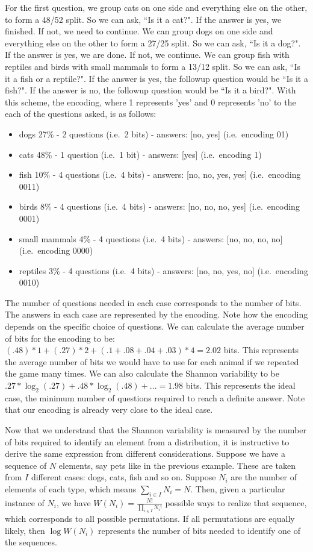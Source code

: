 \documentclass[iopart]{revtex4-1}
\begin{document}
\noindent
For the first question, we group cats on one side and everything else on the other, to form a 48/52 split. So we can ask, ``Is it a cat?". If the answer is yes, we finished. If not, we need to continue. We can group dogs on one side and everything else on the other to form a 27/25 split. So we can ask, ``Is it a dog?". If the answer is yes, we are done. If not, we continue. We can group fish with reptiles and birds with small mammals to form a 13/12 split. So we can ask, ``Is it a fish or a reptile?". If the answer is yes, the followup question would be ``Is it a fish?". If the answer is no, the followup question would be ``Is it a bird?". With this scheme, the encoding, where 1 represents 'yes' and 0 represents 'no' to the each of the questions asked, is as follows:
\begin{itemize}
\item dogs 27\% - 2 questions (i.e.~2 bits) - answers: [no, yes] (i.e.~encoding 01)
\item cats 48\% - 1 question (i.e.~1 bit) - answers: [yes] (i.e.~encoding 1)
\item fish 10\% - 4 questions (i.e.~4 bits) - answers: [no, no, yes, yes] (i.e.~encoding 0011)
\item birds 8\% - 4 questions (i.e.~4 bits) - answers: [no, no, no, yes] (i.e.~encoding 0001)
\item small mammals 4\% - 4 questions (i.e.~4 bits) - answers: [no, no, no, no] (i.e.~encoding 0000)
\item reptiles 3\% - 4 questions (i.e.~4 bits) - answers: [no, no, yes, no] (i.e.~encoding 0010)
\end{itemize}
The number of questions needed in each case corresponds to the number of bits. The answers in each case are represented by the encoding. Note how the encoding depends on the specific choice of questions. We can calculate the average number of bits for the encoding to be:  $(.48) * 1 + (.27) * 2 + (.1 + .08 + .04 + .03) * 4 = 2.02$ bits. This represents the average number of bits we would have to use for each animal if we repeated the game many times. We can also calculate the Shannon variability to be $.27 * \log_2(.27) + .48 * \log_2 (.48) + ... =1.98$ bits. This represents the ideal case, the minimum number of questions required to reach a definite answer. Note that our encoding is already very close to the ideal case.

Now that we understand that the Shannon variability is measured by the number of bits required to identify an element from a distribution, it is instructive to derive the same expression from different considerations. Suppose we have a sequence of $N$ elements, say pets like in the previous example. These are taken from $I$ different cases: dogs, cats, fish and so on. Suppose $N_i$ are the number of elements of each type, which means $\sum_{i \in I} N_i = N$. Then, given a particular instance of $N_i$, we have $W(N_i) = \frac{N!}{\prod_{i \in I} N_i!}$ possible ways to realize that sequence, which corresponds to all possible permutations. If all permutations are equally likely, then $\log W (N_i)$ represents the number of bits needed to identify one of the sequences.
\end{document}
